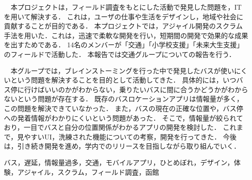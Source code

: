 \documentclass[openany,11pt,papersize,dvipdfm,draft]{jsbook}
\begin{document}
\maketitle

\frontmatter

\begin{jabstract}
　本プロジェクトは，フィールド調査をもとにした活動で発見した問題を，ITを用いて解決する．
これは，ユーザの仕事や生活をデザインし，地域や社会に貢献することが目的である．
本プロジェクトでは，アジャイル開発のスクラム手法を用いた．これは，迅速で柔軟な開発を行い，短期間の開発で効果的な成果を出すためである．
14名のメンバーが「交通」「小学校支援」「未来大生支援」のフィールドで活動した．
本報告では交通グループについての報告を行う．

　本グループでは，ブレインストーミングを行った中で発見したバスが使いにくいという問題を解決することを目的として活動してきた．
具体的には，いつバス停に行けばいいのかがわからない，乗りたいバスに間に合うかどうかがわからないという問題が存在する．
既存のバスロケーションアプリは情報量が多く，この問題を解決できていなかった．
また，バスの現在の正確な位置や，バス停への発着情報がわかりにくいという問題があった．
そこで，情報量が絞られており，一目でバスと自分の位置関係がわかるアプリの開発を検討した．
これまで，見やすいUI，洗練された機能についての考察，開発を行ってきた．
今後は，引き続き開発を進め，学内でのリリースを目指しながら取り組んでいく．

\begin{jkeyword}
バス，遅延，情報量過多，交通，モバイルアプリ，ひとめぼれ，デザイン，体験，アジャイル，スクラム，フィールド調査，函館
\end{jkeyword}
\end{jabstract}
\end{document}
